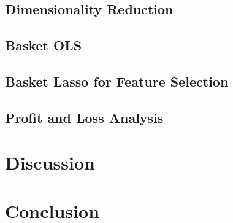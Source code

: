 \documentclass{article}
\begin{document}
\subsection{Dimensionality Reduction}
\subsection{Basket OLS}
\subsection{Basket Lasso for Feature Selection}
\subsection{Profit and Loss Analysis}

\section{Discussion}

\section{Conclusion}
\end{document}
